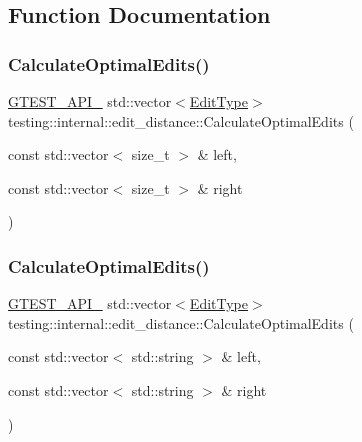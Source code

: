 \subsection{Function Documentation}
\mbox{\label{namespacetesting_1_1internal_1_1edit__distance_ad28f23b77f716200bc6644bfc7413a63}} 
\subsubsection{\texorpdfstring{Calculate\+Optimal\+Edits()}{CalculateOptimalEdits()}\hspace{0.1cm}{\footnotesize\ttfamily [1/2]}}
{\footnotesize\ttfamily \hyperlink{gtest-port_8h_aa73be6f0ba4a7456180a94904ce17790}{G\+T\+E\+S\+T\+\_\+\+A\+P\+I\+\_\+} std\+::vector$<$\hyperlink{namespacetesting_1_1internal_1_1edit__distance_ad46aa6da12aec1a3f166310478b53a08}{Edit\+Type}$>$ testing\+::internal\+::edit\+\_\+distance\+::\+Calculate\+Optimal\+Edits (\begin{DoxyParamCaption}\item[{const std\+::vector$<$ size\+\_\+t $>$ \&}]{left,  }\item[{const std\+::vector$<$ size\+\_\+t $>$ \&}]{right }\end{DoxyParamCaption})}

\mbox{\label{namespacetesting_1_1internal_1_1edit__distance_ad2258c5c811f8f262335f58641b33544}} 
\subsubsection{\texorpdfstring{Calculate\+Optimal\+Edits()}{CalculateOptimalEdits()}\hspace{0.1cm}{\footnotesize\ttfamily [2/2]}}
{\footnotesize\ttfamily \hyperlink{gtest-port_8h_aa73be6f0ba4a7456180a94904ce17790}{G\+T\+E\+S\+T\+\_\+\+A\+P\+I\+\_\+} std\+::vector$<$\hyperlink{namespacetesting_1_1internal_1_1edit__distance_ad46aa6da12aec1a3f166310478b53a08}{Edit\+Type}$>$ testing\+::internal\+::edit\+\_\+distance\+::\+Calculate\+Optimal\+Edits (\begin{DoxyParamCaption}\item[{const std\+::vector$<$ std\+::string $>$ \&}]{left,  }\item[{const std\+::vector$<$ std\+::string $>$ \&}]{right }\end{DoxyParamCaption})}


